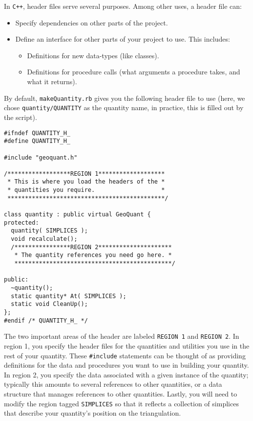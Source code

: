 \documentclass[10pt]{article}%
\begin{document}
In \texttt{C++}, header files serve several purposes. Among other uses, a header file can:
\begin{itemize}
\item  Specify dependencies on other parts of the project.   
\item  Define an interface for other parts of your project to use. This includes:
\begin{itemize}
\item  Definitions for new data-types (like classes).
\item  Definitions for procedure calls (what arguments a procedure takes, and what it returns).
\end{itemize}
\end{itemize}
By default, \texttt{makeQuantity.rb} gives you the following header file to use (here, we chose \texttt{quantity/QUANTITY} as the quantity name, in practice, this is filled out by the script). 
{\small{\begin{verbatim} 
#ifndef QUANTITY_H_
#define QUANTITY_H_

#include "geoquant.h"

/******************REGION 1*******************
 * This is where you load the headers of the *
 * quantities you require.                   *
 *********************************************/

class quantity : public virtual GeoQuant {
protected:
  quantity( SIMPLICES );
  void recalculate();
  /****************REGION 2*********************
   * The quantity references you need go here. *
   *********************************************/

public:
  ~quantity();
  static quantity* At( SIMPLICES );
  static void CleanUp();
};
#endif /* QUANTITY_H_ */
\end{verbatim}
}}
The two important areas of the header are labeled \texttt{REGION 1} and \texttt{REGION 2}. In region 1, you specify the header files for the quantities and utilities you use in the rest of your quantity. These \texttt{\#include} statements can be thought of as providing definitions for the data and procedures you want to use in building your quantity. In region 2, you specify the data associated with a given instance of the quantity; typically this amounts to several references to other quantities, or a data structure that manages references to other quantities. Lastly, you will need to modify the region tagged \texttt{SIMPLICES} so that it reflects a collection of simplices that describe your quantity's position on the triangulation.
\end{document}
